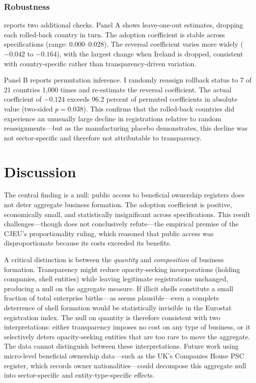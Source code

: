 \documentclass[12pt]{article}
\begin{document}


\subsubsection*{Robustness}  reports two additional checks. Panel A shows leave-one-out estimates, dropping each rolled-back country in turn. The adoption coefficient is stable across specifications (range: 0.000--0.028). The reversal coefficient varies more widely ($-0.042$ to $-0.164$), with the largest change when Ireland is dropped, consistent with country-specific rather than transparency-driven variation.



Panel B reports permutation inference. I randomly reassign rollback status to 7 of 21 countries 1,000 times and re-estimate the reversal coefficient. The actual coefficient of $-0.124$ exceeds 96.2 percent of permuted coefficients in absolute value (two-sided $p = 0.038$). This confirms that the rolled-back countries did experience an unusually large decline in registrations relative to random reassignments---but as the manufacturing placebo demonstrates, this decline was not sector-specific and therefore not attributable to transparency.


\section{Discussion}

The central finding is a null: public access to beneficial ownership registers does not deter aggregate business formation. The adoption coefficient is positive, economically small, and statistically insignificant across specifications. This result challenges---though does not conclusively refute---the empirical premise of the CJEU's proportionality ruling, which reasoned that public access was disproportionate because its costs exceeded its benefits.

A critical distinction is between the \textit{quantity} and \textit{composition} of business formation. Transparency might reduce opacity-seeking incorporations (holding companies, shell entities) while leaving legitimate registrations unchanged, producing a null on the aggregate measure. If illicit shells constitute a small fraction of total enterprise births---as seems plausible---even a complete deterrence of shell formation would be statistically invisible in the Eurostat registration index. The null on quantity is therefore consistent with two interpretations: either transparency imposes no cost on any type of business, or it selectively deters opacity-seeking entities that are too rare to move the aggregate. The data cannot distinguish between these interpretations. Future work using micro-level beneficial ownership data---such as the UK's Companies House PSC register, which records owner nationalities---could decompose this aggregate null into sector-specific and entity-type-specific effects.
\end{document}
